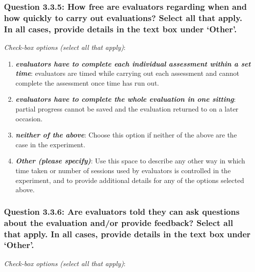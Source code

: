 \documentclass[11pt,a4paper]{article}
\newcommand{\egcvalue}[1]{\textbf{\textit{#1}}}
\begin{document}
\subsubsection*{Question 3.3.5: How free are evaluators regarding when and how quickly to carry out evaluations? Select all that apply. In all cases, provide details in the text box under `Other'.}

\noindent\textit{Check-box options (select all that apply)}:  
\vspace{-.1cm}

\begin{enumerate}[itemsep=0cm,leftmargin=0.5cm,label={\small $\square$}]
    \item \egcvalue{evaluators have to complete each individual assessment within a set time}: evaluators are timed while carrying out each assessment and cannot complete the assessment once time has run out.
    \item \egcvalue{evaluators have to complete the whole evaluation in one sitting}: partial progress cannot be saved and the evaluation returned to on a later occasion.
    \item \egcvalue{neither of the above}: Choose this option if neither of the above are the case in the experiment.
    \item \egcvalue{Other (please specify)}: Use this space to describe any other way in which time taken or number of sessions used by evaluators is controlled in the experiment, and to provide additional details for any of the options selected above.
\end{enumerate}

\subsubsection*{Question 3.3.6: Are evaluators told they can ask questions about the evaluation and/or provide feedback? Select all that apply. In all cases, provide details in the text box under `Other'.}

\noindent\textit{Check-box options (select all that apply)}:  
\vspace{-.1cm}
\end{document}
